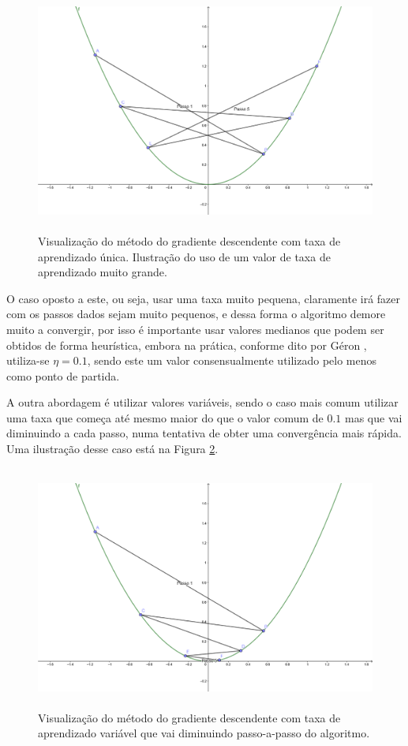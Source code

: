 \begin{figure}[htb]
\centering
\includegraphics[height=8cm]{figuras/grad_2}
\caption{Visualização do método do gradiente descendente com taxa de aprendizado única. Ilustração do uso de um valor de taxa de aprendizado muito grande.}
\label{fig:grad_2}
\end{figure}

O caso oposto a este, ou seja, usar uma taxa muito pequena, claramente irá fazer com os passos dados sejam muito pequenos, e dessa forma o algoritmo demore muito a convergir, por isso é importante usar valores medianos que podem ser obtidos de forma heurística, embora na prática, conforme dito por Géron \citep{hands}, utiliza-se $\eta = 0.1$, sendo este um valor consensualmente utilizado pelo menos como ponto de partida.

A outra abordagem é utilizar valores variáveis, sendo o caso mais comum utilizar uma taxa que começa até mesmo maior do que o valor comum de $0.1$ mas que vai diminuindo a cada passo, numa tentativa de obter uma convergência mais rápida. Uma ilustração desse caso está na Figura \ref{fig:grad_3}.

\begin{figure}[htb]
\centering
\includegraphics[height=8cm]{figuras/grad_3}
\caption{Visualização do método do gradiente descendente com taxa de aprendizado variável que vai diminuindo passo-a-passo do algoritmo.}
\label{fig:grad_3}
\end{figure}

